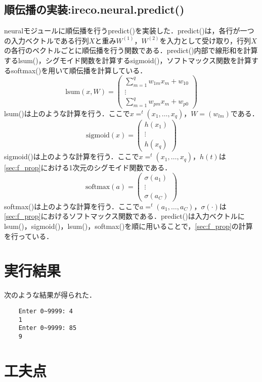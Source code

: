 \documentclass[uplatex]{jsarticle}
\begin{document}
    \subsection{順伝播の実装:ireco.neural.predict()}
    neuralモジュールに順伝播を行うpredict()を実装した．predict()は，各行が一つの入力ベクトルである行列$X$と重み$W^{(1)}$，$W^{(2)}$を入力として受け取り，行列$X$の各行のベクトルごとに順伝播を行う関数である．predict()内部で線形和を計算するlsum()，シグモイド関数を計算するsigmoid()，ソフトマックス関数を計算するsoftmax()を用いて順伝播を計算している．
    $$\mbox{lsum}(x, W) = 
    \begin{pmatrix} 
        \sum_{m = 1}^q w_{1m} x_m + w_{10} \\
        \vdots \\
        \sum_{m = 1}^q w_{pm} x_m + w_{p0}
    \end{pmatrix}
    $$
    lsum()は上のような計算を行う．ここで$x = ^t\!(x_1, \ldots , x_q)$，$W = (w_{lm})$である．
    $$\mbox{sigmoid}(x) =
    \begin{pmatrix}
        h(x_1) \\
        \vdots \\
        h(x_q)
    \end{pmatrix}
    $$
    sigmoid()は上のような計算を行う．ここで$x = ^t\!(x_1, \ldots , x_q)$，$h(t)$は\ref{sec:f_prop}における1次元のシグモイド関数である．
    $$\mbox{softmax}(a) =
    \begin{pmatrix}
        \sigma(a_1) \\
        \vdots \\
        \sigma(a_C)
    \end{pmatrix}
    $$
    softmax()は上のような計算を行う．ここで$a = ^t\!(a_1, \ldots ,a_C)$，$\sigma(\cdot)$は\ref{sec:f_prop}におけるソフトマックス関数である．predict()は入力ベクトルにlsum()，sigmoid()，lsum()，softmax()を順に用いることで，\ref{sec:f_prop}の計算を行っている．

    \section{実行結果}
    次のような結果が得られた．
    \begin{lstlisting}
    Enter 0~9999: 4
    1
    Enter 0~9999: 85
    9
    \end{lstlisting}

    \section{工夫点}
\end{document}
